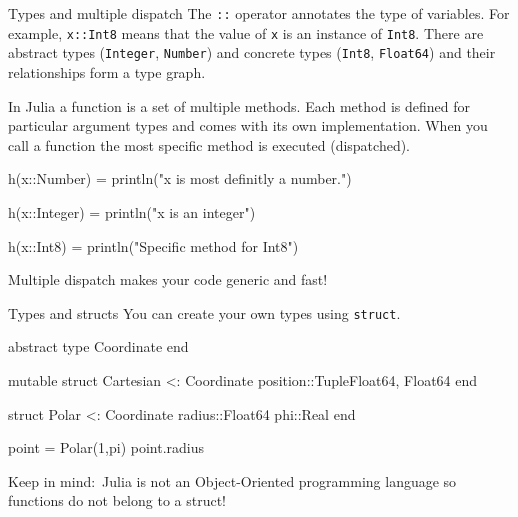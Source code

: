 \documentclass{beamer}
\newenvironment{Boxx}{\begin{tcolorbox}[standard jigsaw, opacityframe=0.8, opacityback=0.0]}{\end{tcolorbox}}
\begin{document}
\begin{frame}[fragile]{Types and multiple dispatch}
	The \verb|::| operator annotates the type of variables. For example, \verb|x::Int8| means that the value of \verb|x| is an instance of \verb|Int8|. There are abstract types (\verb|Integer|, \verb|Number|) and concrete types (\verb|Int8|, \verb|Float64|) and their relationships form a type graph.
	\vspace*{5mm}
	
	In Julia a function is a set of multiple methods. Each method is defined for particular argument types and comes with its own implementation. When you call a function the most specific method is executed (dispatched).
	\begin{Boxx}
	\begin{jllisting}
  h(x::Number) = println("x is most definitly a number.")

  h(x::Integer) = println("x is an integer")
  
  h(x::Int8) = println("Specific method for Int8")
	\end{jllisting}
\end{Boxx}
Multiple dispatch makes your code generic and fast!
\end{frame}


\begin{frame}[fragile]{Types and structs}
 You can create your own types using \verb|struct|.
 \begin{Boxx}
  \begin{jllisting}
  abstract type Coordinate end
  
  mutable struct Cartesian <: Coordinate
    position::Tuple{Float64, Float64}
  end
  
  struct Polar <: Coordinate
    radius::Float64
    phi::Real
  end
  
  point = Polar(1,pi)
  point.radius
  \end{jllisting}
\end{Boxx}
Keep in mind:~Julia is not an Object-Oriented programming language so functions do not belong to a struct!
\end{frame}
\end{document}
